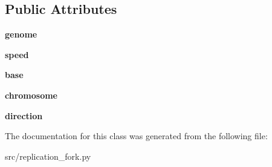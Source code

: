 \subsection*{Public Attributes}
\begin{DoxyCompactItemize}
\item 
\mbox{\label{classReDyMo_1_1src_1_1replication__fork_1_1ReplicationFork_afd39fc7e88c20db282a9b11df91ae101}} 
{\bfseries genome}
\item 
\mbox{\label{classReDyMo_1_1src_1_1replication__fork_1_1ReplicationFork_adbe68a96a3b32e68bf35bdbbc8fb0a82}} 
{\bfseries speed}
\item 
\mbox{\label{classReDyMo_1_1src_1_1replication__fork_1_1ReplicationFork_a76bd0fbe450156a61a928fb5cf25c39e}} 
{\bfseries base}
\item 
\mbox{\label{classReDyMo_1_1src_1_1replication__fork_1_1ReplicationFork_a936470ed19a944ccbad8e74ff4611364}} 
{\bfseries chromosome}
\item 
\mbox{\label{classReDyMo_1_1src_1_1replication__fork_1_1ReplicationFork_a0819d705f6ea278009b29bc5d7b02b1d}} 
{\bfseries direction}
\end{DoxyCompactItemize}


The documentation for this class was generated from the following file\+:\begin{DoxyCompactItemize}
\item 
src/replication\+\_\+fork.\+py\end{DoxyCompactItemize}
